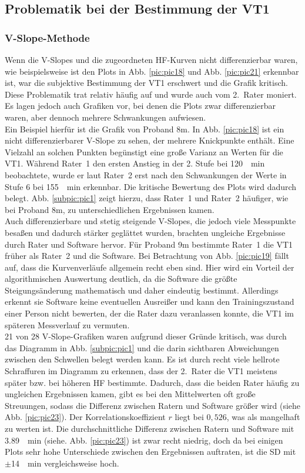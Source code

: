 \subsection{Problematik bei der Bestimmung der VT1}
%
\subsubsection{V-Slope-Methode}
%
Wenn die V-Slopes und die zugeordneten \acs{HF}-Kurven nicht differenzierbar waren, wie beispielsweise ist den Plots in Abb. \ref{pic:pic18} und Abb. \ref{pic:pic21} erkennbar ist, war die subjektive Bestimmung der VT1 erschwert und die Grafik kritisch. Diese Problematik trat relativ häufig auf und wurde auch vom 2.~Rater moniert. Es lagen jedoch auch Grafiken vor, bei denen die Plots zwar differenzierbar waren, aber dennoch mehrere Schwankungen aufwiesen.\\
Ein Beispiel hierfür ist die Grafik von Proband 8m. In Abb. \ref{pic:pic18} ist ein nicht differenzierbarer V-Slope zu sehen, der mehrere Knickpunkte enthält. Eine Vielzahl an solchen Punkten begünstigt eine große Varianz an Werten für die VT1. Während Rater~1 den ersten Anstieg in der 2. Stufe bei \SI{120}{\per\minute} beobachtete, wurde er laut Rater~2 erst nach den Schwankungen der Werte in Stufe 6 bei \SI{155}{\per\minute} erkennbar. Die kritische Bewertung des Plots wird dadurch belegt. Abb. \ref{subpic:pic1} zeigt hierzu, dass Rater~1 und Rater~2 häufiger, wie bei Proband 8m, zu unterschiedlichen Ergebnissen kamen.\\
Auch differenzierbare und stetig steigende V-Slopes, die jedoch viele Messpunkte besaßen und dadurch stärker geglättet wurden, brachten ungleiche Ergebnisse durch Rater und Software hervor. Für Proband 9m bestimmte Rater~1 die VT1 früher als Rater~2 und die Software. Bei Betrachtung von Abb. \ref{pic:pic19} fällt auf, dass die Kurvenverläufe allgemein recht eben sind. Hier wird ein Vorteil der algorithmischen Auswertung deutlich, da die Software die größte Steigungsänderung mathematisch und daher eindeutig bestimmt. Allerdings erkennt sie Software keine eventuellen Ausreißer und kann den Trainingszustand einer Person nicht bewerten, der die Rater dazu veranlassen konnte, die VT1 im späteren Messverlauf zu vermuten.\\
21 von 28 V-Slope-Grafiken waren aufgrund dieser Gründe kritisch, was durch das Diagramm in Abb. \ref{subpic:pic1} und die darin sichtbaren Abweichungen zwischen den Schwellen belegt werden kann. Es ist durch recht viele hellrote Schraffuren im Diagramm zu erkennen, dass der 2.~Rater die VT1 meistens später bzw. bei höheren \acs{HF} bestimmte. Dadurch, dass die beiden Rater häufig zu ungleichen Ergebnissen kamen, gibt es bei den Mittelwerten oft große Streuungen, sodass die Differenz zwischen Ratern und Software größer wird (siehe Abb. \ref{pic:pic23}). Der Korrelationskoeffizient $r$ liegt bei $0,526$, was als mangelhaft zu werten ist. Die durchschnittliche Differenz zwischen Ratern und Software mit \SI{3,89}{\per\minute} (siehe. Abb. \ref{pic:pic23}) ist zwar recht niedrig, doch da bei einigen Plots sehr hohe Unterschiede zwischen den Ergebnissen auftraten, ist die \acs{SD} mit $\pm$\SI{14}{\per\minute} vergleichsweise hoch.
%
